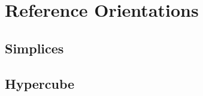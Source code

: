 \chapter{Reference Orientations} \label{chap:orientations}

\section{Simplices}


\section{Hypercube}